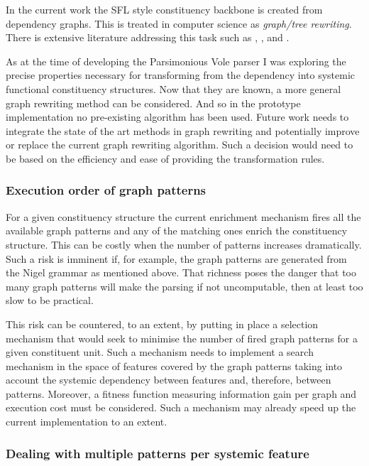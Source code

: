     In the current work the SFL style constituency backbone is created from dependency graphs. This is treated in computer science as \textit{graph/tree rewriting}. There is extensive literature addressing this task such as \citet{barendregt1987term}, \citet{courcelle1990graph}, \citet{plasmeijer1993functional} and \citet{grzegorz1999handbook}. 
    
    As at the time of developing the Parsimonious Vole parser I was exploring the precise properties necessary for transforming from the dependency into systemic functional constituency structures. Now that they are known, a more general graph rewriting method can be considered. And so in the prototype implementation no pre-existing algorithm has been used. Future work needs to integrate the state of the art methods in graph rewriting and potentially improve or replace the current graph rewriting algorithm. Such a decision would need to be based on the efficiency and ease of providing the transformation rules.

\subsubsection{Execution order of graph patterns}  
    
    For a given constituency structure the current enrichment mechanism fires all the available graph patterns and any of the matching ones enrich the constituency structure. This can be costly when the number of patterns increases dramatically. Such a risk is imminent if, for example, the graph patterns are generated from the Nigel grammar as mentioned above. That richness poses the danger that too many graph patterns will make the parsing if not uncomputable, then at least too slow to be practical. 
    
    This risk can be countered, to an extent, by putting in place a selection mechanism that would seek to minimise the number of fired graph patterns for a given constituent unit. Such a mechanism needs to implement a search mechanism in the space of features covered by the graph patterns taking into account the systemic dependency between features and, therefore, between patterns. Moreover, a fitness function measuring information gain per graph and execution cost must be considered. Such a mechanism may already speed up the current implementation to an extent. 
    
\subsubsection{Dealing with multiple patterns per systemic feature}    

